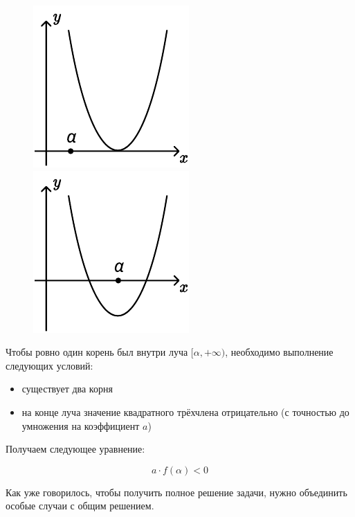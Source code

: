 \begin {figure}[h]
    \begin {minipage} [t] {0.5\linewidth}
        \centering
        \includegraphics [width=0.6\linewidth] {images/image_20.pdf}
    \end {minipage}
    \hfill
    \begin {minipage} [t] {0.5\linewidth}
        \centering
        \includegraphics [width=0.6\linewidth] {images/image_21.pdf}
    \end {minipage}
\end {figure}

Чтобы ровно один корень был внутри луча $[\alpha, +\infty)$, необходимо выполнение следующих
условий:

\begin {itemize}
    \item {существует два корня}
    \item {на конце луча значение квадратного трёхчлена отрицательно (с точностью до умножения на
           коэффициент $a$)}
\end {itemize}

Получаем следующее уравнение:

\begin {equation*}
    a \cdot f(\alpha) < 0
\end {equation*}

Как уже говорилось, чтобы получить полное решение задачи, нужно объединить особые случаи с общим
решением.
